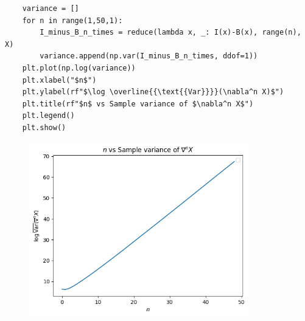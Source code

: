 \begin{verbatim}
    variance = []
    for n in range(1,50,1):
        I_minus_B_n_times = reduce(lambda x, _: I(x)-B(x), range(n), X)
        variance.append(np.var(I_minus_B_n_times, ddof=1))
    plt.plot(np.log(variance))
    plt.xlabel("$n$")
    plt.ylabel(rf"$\log \overline{{\text{{Var}}}}(\nabla^n X)$")
    plt.title(rf"$n$ vs Sample variance of $\nabla^n X$")
    plt.legend()
    plt.show()
\end{verbatim}

\begin{figure}[H]
    \centering
    \includegraphics[width=0.85\textwidth]{../pictures/image7.png}
\end{figure}
